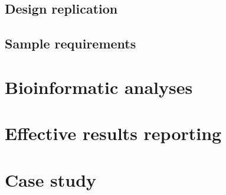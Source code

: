 \documentclass[graybox]{svmult}
\begin{document}
\subsection{Design replication}
\label{subsec:2}

\subsection{Sample requirements }
\label{subsec:2}

\section{Bioinformatic analyses}
\label{sec:4}


\section{Effective results reporting }
\label{sec:5}

\section{Case study}
\label{sec:6}

%
\end{document}

